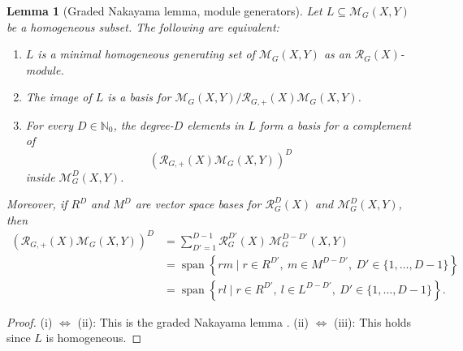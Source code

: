 \documentclass[11pt]{article}
\newcommand{\dsN}{\mathbb{N}}
\newcommand{\scM}{\mathcal{M}}
\newcommand{\scR}{\mathcal{R}}
\newcommand{\Span}{\operatorname{span}}
\newcommand{\set}[1]{\{#1\}}
\newtheorem{lemma}[theorem]{Lemma}
\theoremstyle{definition}
\begin{document}
\begin{lemma}[Graded Nakayama lemma, module generators]\label{lem:module-generators}
  Let $L\subseteq \scM_G(X,Y)$ be a homogeneous subset.
  The following are equivalent:
  \begin{enumerate}[label=\textup{(\roman*)}, leftmargin=2em]
    \item $L$ is a minimal homogeneous generating set of $\scM_G(X,Y)$ as an $\scR_G(X)$-module.
    \item The image of $L$ is a basis for $\scM_G(X,Y)\big/\scR_{G,+}(X)\scM_G(X,Y)$.
    \item For every $D\in\dsN_0$, the degree-$D$ elements in $L$ form a basis for a complement of
    \[
      \left(\scR_{G,+}(X)\scM_G(X,Y)\right)^D
    \]
    inside $\scM_G^D(X,Y)$.
  \end{enumerate}
  Moreover, if $R^D$ and $M^D$ are vector space bases for $\scR_G^{D}(X)$ and $\scM_G^D(X,Y)$, then
  \[
    \begin{aligned}
      \left(\scR_{G,+}(X)\scM_G(X,Y)\right)^D
      &=
      \sum_{D'=1}^{D-1} \scR_G^{D'}(X)\,\scM_G^{D-D'}(X,Y) \\
      &=
      \Span\left\{r m \mid r \in R^{D'},\ m \in M^{D-D'},\ D' \in \set{1,\dots,D-1}\right\} \\
      &=
      \Span\left\{r l \mid r \in R^{D'},\ l \in L^{D-D'},\ D' \in \set{1,\dots,D-1}\right\}.
    \end{aligned}
  \]
\end{lemma}
\begin{proof}
  \textup{(i)} $\iff$ \textup{(ii)}: This is the graded Nakayama lemma \cite[Lemma 10.56.1]{Stacks0EKB}.
  \textup{(ii)} $\iff$ \textup{(iii)}: This holds since $L$ is homogeneous.
\end{proof}
\end{document}
